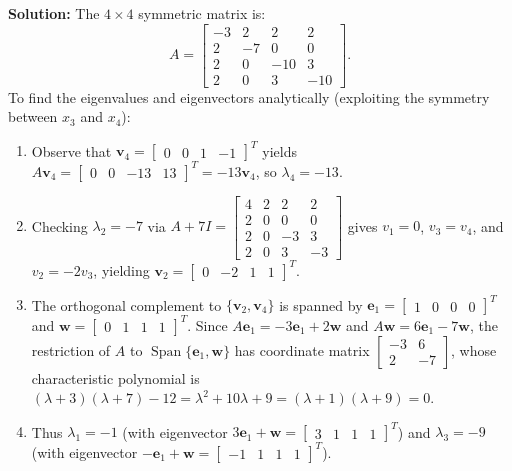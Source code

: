 \documentclass[11pt, letterpaper]{article}
\theoremstyle{definition}
\theoremstyle{remark}
\begin{document}
\textbf{Solution:}
The $4 \times 4$ symmetric matrix is:
\[
A = \begin{bmatrix} -3 & 2 & 2 & 2 \\ 2 & -7 & 0 & 0 \\ 2 & 0 & -10 & 3 \\ 2 & 0 & 3 & -10 \end{bmatrix}.
\]
To find the eigenvalues and eigenvectors analytically (exploiting the symmetry between $x_3$ and $x_4$):
\begin{enumerate}
    \item Observe that $\mathbf{v}_4 = \begin{bmatrix} 0 & 0 & 1 & -1 \end{bmatrix}^T$ yields $A\mathbf{v}_4 = \begin{bmatrix} 0 & 0 & -13 & 13 \end{bmatrix}^T = -13\mathbf{v}_4$, so $\lambda_4 = -13$.
    \item Checking $\lambda_2 = -7$ via $A + 7I = \begin{bmatrix} 4 & 2 & 2 & 2 \\ 2 & 0 & 0 & 0 \\ 2 & 0 & -3 & 3 \\ 2 & 0 & 3 & -3 \end{bmatrix}$ gives $v_1 = 0$, $v_3 = v_4$, and $v_2 = -2v_3$, yielding $\mathbf{v}_2 = \begin{bmatrix} 0 & -2 & 1 & 1 \end{bmatrix}^T$.
    \item The orthogonal complement to $\{\mathbf{v}_2, \mathbf{v}_4\}$ is spanned by $\mathbf{e}_1 = \begin{bmatrix} 1 & 0 & 0 & 0 \end{bmatrix}^T$ and $\mathbf{w} = \begin{bmatrix} 0 & 1 & 1 & 1 \end{bmatrix}^T$. Since $A\mathbf{e}_1 = -3\mathbf{e}_1 + 2\mathbf{w}$ and $A\mathbf{w} = 6\mathbf{e}_1 - 7\mathbf{w}$, the restriction of $A$ to $\operatorname{Span}\{\mathbf{e}_1, \mathbf{w}\}$ has coordinate matrix $\begin{bmatrix} -3 & 6 \\ 2 & -7 \end{bmatrix}$, whose characteristic polynomial is $(\lambda + 3)(\lambda + 7) - 12 = \lambda^2 + 10\lambda + 9 = (\lambda + 1)(\lambda + 9) = 0$.
    \item Thus $\lambda_1 = -1$ (with eigenvector $3\mathbf{e}_1 + \mathbf{w} = \begin{bmatrix} 3 & 1 & 1 & 1 \end{bmatrix}^T$) and $\lambda_3 = -9$ (with eigenvector $-\mathbf{e}_1 + \mathbf{w} = \begin{bmatrix} -1 & 1 & 1 & 1 \end{bmatrix}^T$).
\end{enumerate}
\end{document}
